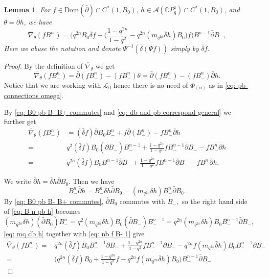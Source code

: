 \documentclass[12pt]{article}
\newtheorem{lemma}[definition]{Lemma}
\numberwithin{equation}{section}
\def\Dom{{\mathrm {Dom}}}
\def\pb{\bar{\partial}}
\def\db{\bar{\delta}}
\def\nb{\bar{\nabla}_\theta}
\def\nb{\overline{\nabla}_\theta}
\def\C{{\mathbb C}}
\def\A{\mathcal{A}}
\def\L{\mathcal{L}}
\def\d{\bar{\delta}}
\begin{document}
\begin{lemma}\label{lemma: nabla of f B-}
    For  $f\in \Dom(\pb)\cap C^*(1, B_0)$, $h\in  \A(\C P^1_q)\cap C^*(1, B_0)$, and $\theta=\pb h$, we have
        \begin{equation}
            \nb (f B_-^n) = \Big( q^{2n} B_0 \db f + \big(\frac{1-q^{2n}}{1-q^2} - q^{2n} (m_{q^{2n}} \db h) B_0\big) f\Big) B_-^{n-1} \pb B_-,
        \end{equation}
     Here we abuse the notation and denote $\Psi^{-1}(\db (\Psi f))$ simply by $\db f$.
\end{lemma}
\begin{proof}
    By the definition of $\nb$   we get $$
    \nb(f B_-^n) = \pb(f B_-^n) - (f B_-^n)\theta= \pb(f B_-^n) - (f B_-^n)\pb h.
    $$
Notice that we are working with $\L_0$ hence there is no need of $\Phi_{(n)}$ as in \eqref{eq: pb-connections omega}. 

By  \eqref{eq: B0 pb B- B+ commutes}  and \eqref{eq: db and pb correspond general} we further get
    \begin{equation}\label{eq: nb f B- 1}
    \begin{split}
   \nb(f B_-^n) & = (\d f) \pb B_0 B_-^n + f \pb(B_-^n) - f B_-^n \pb h\\
    =& q^2 (\d f) B_0 (\pb B_-) B_-^{n-1} + \frac{1-q^{2n}}{1-q^2} f B_-^{n-1} \pb B_- - f B_-^n \pb h\\
    =& q^{2n} (\d f) B_0 B_-^{n-1} \pb B_- + \frac{1-q^{2n}}{1-q^2} f B_-^{n-1} \pb B_- - f B_-^n \pb h.
    \end{split}
    \end{equation}

    We write $\pb h = \d h \pb B_0.$ Then we have 
    \begin{equation}\label{eq: B-n pb h}
    B_-^n \pb h = B_-^n \d h \pb B_0 =  (m_{q^{2n}} \d h) B_-^n \pb B_0.
    \end{equation}
    By \eqref{eq: B0 pb B- B+ commutes}, $\pb B_0$ commutes with $B_-,$ so the right hand side of \eqref{eq: B-n pb h} becomes \begin{equation}\label{eq: mq db h}
    (m_{q^{2n}} \d h) (\pb B_0) B_-^n = q^2 (m_{q^{2n}} \d h) B_0 (\pb B_-) B_-^{n-1} = q^{2n} (m_{q^{2n}} \d h) B_0 B_-^{n-1} \pb B_-,
    \end{equation}
    \eqref{eq: mq db h} together with \eqref{eq: nb f B- 1} give
    \begin{equation}\label{eq: nb f B- 2} 
    \begin{split}
    \nb(f B_-^n) =& q^{2n} (\d f) B_0 B_-^{n-1} \pb B_- +  \frac{1-q^{2n}}{1-q^2} f B_-^{n-1} \pb B_- - q^{2n} f (m_{q^{2n}} \d h) B_0 B_-^{n-1} \pb B_-\\
    =& \Big( q^{2n} (\d f) B_0 +  \frac{1-q^{2n}}{1-q^2}f  - q^{2n} f (m_{q^{2n}} \d h) B_0 \Big) B_-^{n-1} \pb B_- 
    \end{split}
    \end{equation}



\end{proof}
\end{document}
